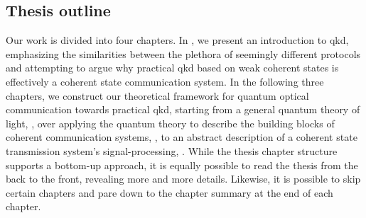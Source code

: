 \subsection*{Thesis outline}

Our work is divided into four chapters.
In , we present an introduction to \gls{qkd}, emphasizing the similarities between the plethora of seemingly different protocols and attempting to argue why practical \gls{qkd} based on weak coherent states is effectively a coherent state communication system.
In the following three chapters, we construct our theoretical framework for quantum optical communication towards practical \gls{qkd}, starting from a general quantum theory of light, , over applying the quantum theory to describe the building blocks of coherent communication systems, , to an abstract description of a coherent state transmission system's signal-processing, .
While the thesis chapter structure supports a bottom-up approach, it is equally possible to read the thesis from the back to the front, revealing more and more details.
Likewise, it is possible to skip certain chapters and pare down to the chapter summary at the end of each chapter.